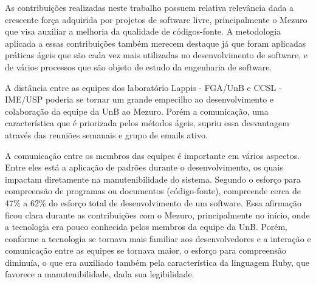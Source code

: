 As contribuições realizadas neste trabalho possuem relativa relevância dada a crescente força adquirida por projetos de software livre, principalmente o Mezuro que visa auxiliar a melhoria da qualidade de códigos-fonte. A metodologia aplicada a essas contribuições também merecem destaque já que foram aplicadas práticas ágeis que são cada vez mais utilizadas no desenvolvimento de software, e de vários processos que são objeto de estudo da engenharia de software.

A distância entre as equipes dos laboratório Lappis - FGA/UnB e CCSL - IME/USP poderia se tornar um grande empecilho ao desenvolvimento e colaboração da equipe da UnB ao Mezuro. Porém a comunicação, uma característica que é priorizada pelos métodos ágeis, supriu essa desvantagem através das reuniões semanais e grupo de emails ativo.

A comunicação entre os membros das equipes é importante em vários aspectos. Entre eles está a aplicação de padrões durante o desenvolvimento, os quais impactam diretamente na manutenibilidade do sistema. Segundo \citeauthor{pigoski1996practical} o esforço para compreensão de programas ou documentos (código-fonte), compreende cerca de 47\% a 62\% do esforço total de desenvolvimento de um software. Essa afirmação ficou clara durante as contribuições com o Mezuro, principalmente no início, onde a tecnologia era pouco conhecida pelos membros da equipe da UnB. Porém, conforme a tecnologia se tornava mais familiar aos desenvolvedores e a interação e  comunicação entre as equipes se tornava maior, o esforço para compreensão diminuía, o que era auxiliado também pela característica da linguagem Ruby, que favorece a manutenibilidade, dada sua legibilidade.